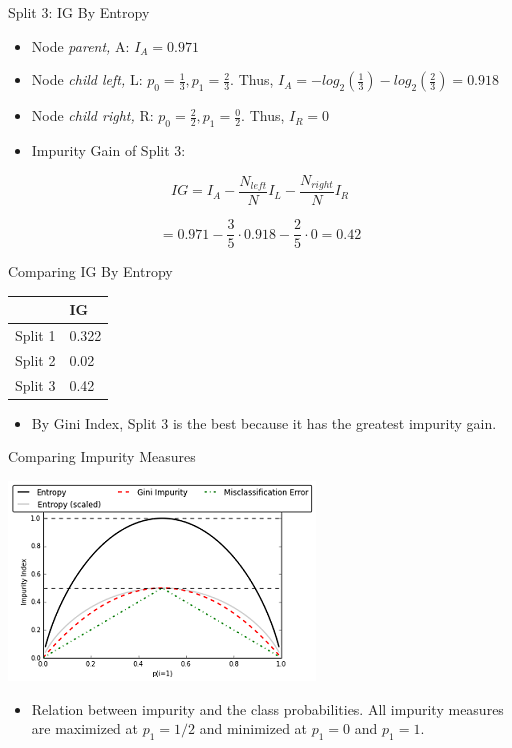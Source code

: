 \documentclass[
  ignorenonframetext,
]{beamer}
\providecommand{\tightlist}{%
  \setlength{\itemsep}{0pt}\setlength{\parskip}{0pt}}
\begin{document}
\begin{frame}{Split 3: IG By Entropy}
\protect\hypertarget{split-3-ig-by-entropy-1}{}

\begin{itemize}
\item
  Node \emph{parent,} A: \(I_{A} = 0.971\)
\item
  Node \emph{child left,} L: \(p_0 = \frac{1}{3}, p_1 = \frac{2}{3}\).
  Thus, \(I_{A} = -log_2(\frac{1}{3}) -log_2(\frac{2}{3}) = 0.918\)
\item
  Node \emph{child right,} R: \(p_0 = \frac{2}{2}, p_1 = \frac{0}{2}\).
  Thus, \(I_{R} = 0\)
\item
  Impurity Gain of Split 3:
\end{itemize}

\[
IG = I_{A} - \frac{N_{left}}{N}I_{L}-\frac{N_{right}}{N}I_{R}
\]

\[                            = 0.971 - \frac{3}{5} \cdot 0.918 - \frac{2}{5} \cdot 0 = 0.42\]

\end{frame}

\begin{frame}{Comparing IG By Entropy}
\protect\hypertarget{comparing-ig-by-entropy}{}

\begin{longtable}[]{@{}ll@{}}
\toprule
& IG\tabularnewline
\midrule
\endhead
Split 1 & 0.322\tabularnewline
Split 2 & 0.02\tabularnewline
Split 3 & 0.42\tabularnewline
\bottomrule
\end{longtable}

\begin{itemize}
\tightlist
\item
  By Gini Index, Split 3 is the best because it has the greatest
  impurity gain.
\end{itemize}

\end{frame}

\begin{frame}{Comparing Impurity Measures}
\protect\hypertarget{comparing-impurity-measures}{}

\includegraphics{images2/i.png}

\begin{itemize}
\tightlist
\item
  Relation between impurity and the class probabilities. All impurity
  measures are maximized at \textbf{\(p_1 =1/2\)} and minimized at
  \textbf{\(p_1 = 0\)} and \textbf{\(p_1=1\)}.\\
\end{itemize}

\end{frame}
\end{document}
